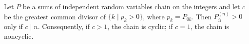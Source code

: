 Let $P$ be a sums of independent random variables chain on the integers and let $c$ be the greatest common divisor of $\{k \mid p_k > 0\}$, where $p_k = P_{0k}$. Then $P_{ii}^{(n)} > 0$ only if $c \mid n$. Consequently, if $c > 1$, the chain is cyclic; if $c = 1$, the chain is noncyclic.

